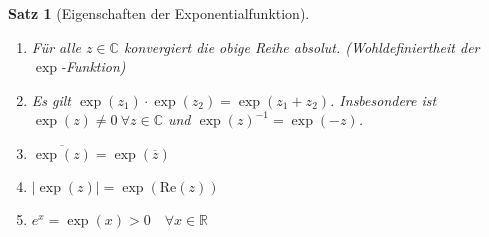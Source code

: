 \documentclass[11pt, twoside, a4paper]{article}
\theoremstyle{plain}
\newtheorem{satz}[blockelement]{Satz}
\newcommand{\abs}[1]{\left|#1\right|}
\newcommand{\theoremescape}{\leavevmode}
\renewcommand{\Re}{\text{Re}}
\newcommand{\conj}[1]{\overline{#1}}
\newcommand{\R}{\mathbb{R}}
\newcommand{\C}{\mathbb{C}}
\begin{document}
    \begin{satz}[Eigenschaften der Exponentialfunktion]
        \theoremescape
        \begin{enumerate}[label=(\alph*)]
            \item Für alle $z\in\C$ konvergiert die obige Reihe absolut. (Wohldefiniertheit der $\exp$-Funktion)
            \item Es gilt $\exp(z_1)\cdot\exp(z_2) = \exp(z_1+z_2)$. Insbesondere ist $\exp(z)\neq 0~\forall z\in\C$ und $\exp(z)^{-1} = \exp(-z)$.
            \item $\conj{\exp(z)} = \exp(\conj{z})$
            \item $\abs{\exp(z)} = \exp(\Re(z))$
            \item $e^x = \exp(x) > 0\quad\forall x\in\R$
        \end{enumerate}


\end{satz}
\end{document}
